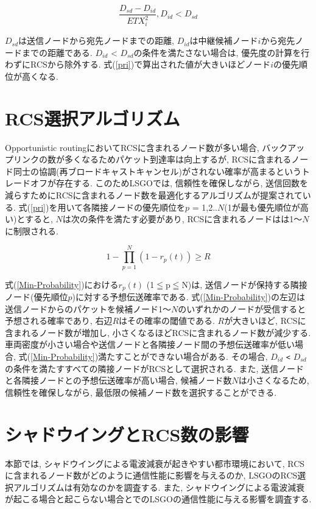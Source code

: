 \documentclass[10pt]{jreport}
\begin{document}
\begin{equation}
	\label{pri}
	\frac{D_{sd} - D_{id}}{ETX_{i}^{2}} ,   D_{id} < D_{sd}
\end{equation}

$D_{sd}$は送信ノードから宛先ノードまでの距離, $D_{id}$は中継候補ノード$i$から宛先ノードまでの距離である.  $D_{id}$ < $D_{sd}$の条件を満たさない場合は, 優先度の計算を行わずにRCSから除外する.
式(\ref{pri})で算出された値が大きいほどノード$i$の優先順位が高くなる. 

\section{RCS選択アルゴリズム}
Opportunistic routingにおいてRCSに含まれるノード数が多い場合, バックアップリンクの数が多くなるためパケット到達率は向上するが, RCSに含まれるノード同士の協調(再ブロードキャストキャンセル)がされない確率が高まるというトレードオフが存在する.  
このためLSGOでは, 信頼性を確保しながら, 送信回数を減らすためにRCSに含まれるノード数を最適化するアルゴリズムが提案されている.  
式(\ref{pri})を用いて各隣接ノードの優先順位を$p$ = 1,2..$N$(1が最も優先順位が高い)とすると, $N$は次の条件を満たす必要があり, RCSに含まれるノードはは1～$N$に制限される. 

\begin{equation}
	\label{Min-Probability}
	1 - \prod_{p=1}^N (1 - r_{p}(t))\geq R
\end{equation}

式(\ref{Min-Probability})における$r_{p}(t)$ (1$ \leqq $p$ \leqq $N)は, 送信ノードが保持する隣接ノード(優先順位$p$)に対する予想伝送確率である. 
式(\ref{Min-Probability})の左辺は送信ノードからのパケットを候補ノード1～$N$のいずれかのノードが受信すると予想される確率であり, 右辺$R$はその確率の閾値である. $R$が大きいほど, RCSに含まれるノード数が増加し, 小さくなるほどRCSに含まれるノード数が減少する. 車両密度が小さい場合や送信ノードと各隣接ノード間の予想伝送確率が低い場合, 式(\ref{Min-Probability})満たすことができない場合がある. その場合, $D_{id}$ \verb|<| $D_{sd}$の条件を満たすすべての隣接ノードがRCSとして選択される. また, 送信ノードと各隣接ノードとの予想伝送確率が高い場合, 候補ノード数$N$は小さくなるため, 信頼性を確保しながら, 最低限の候補ノード数を選択することができる. 


\section{シャドウイングとRCS数の影響}
\label{LSGO_evaluation}

本節では, シャドウイングによる電波減衰が起きやすい都市環境において, RCSに含まれるノード数がどのように通信性能に影響を与えるのか, LSGOのRCS選択アルゴリズムは有効なのかを調査する.
また, シャドウイングによる電波減衰が起こる場合と起こらない場合とでのLSGOの通信性能に与える影響を調査する.
\end{document}

